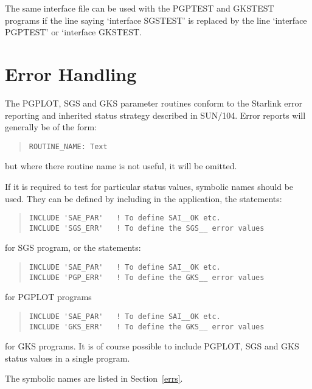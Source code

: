 \documentclass[twoside,11pt]{article}
\newcommand{\hyperref}[4]{#2\ref{#4}#3}
\newcommand{\xref}[3]{#1}
\renewcommand{\_}{\texttt{\symbol{95}}}
\begin{document}
The same interface file can be used with the PGPTEST and GKSTEST programs if
the line saying `interface SGSTEST' is replaced by the line `interface
PGPTEST' or `interface GKSTEST.

\section{Error Handling}
\label{errhnd}
The PGPLOT, SGS and GKS parameter routines conform to the Starlink error
reporting and inherited status strategy described in \xref{SUN/104}{sun104}{}.
Error reports will generally be of the form:
\begin{quote}
\begin{verbatim}
ROUTINE_NAME: Text
\end{verbatim}
\end{quote}
but where there routine name is not useful, it will be omitted.

If it is required to test for particular status values, symbolic names should
be used. They can be defined by including in the application, the statements:

\begin{quote}
\begin{verbatim}
INCLUDE 'SAE_PAR'   ! To define SAI__OK etc.
INCLUDE 'SGS_ERR'   ! To define the SGS__ error values
\end{verbatim}
\end{quote}

for SGS program, or the statements:

\begin{quote}
\begin{verbatim}
INCLUDE 'SAE_PAR'   ! To define SAI__OK etc.
INCLUDE 'PGP_ERR'   ! To define the GKS__ error values
\end{verbatim}
\end{quote}

for PGPLOT programs\begin{quote}

\begin{verbatim}
INCLUDE 'SAE_PAR'   ! To define SAI__OK etc.
INCLUDE 'GKS_ERR'   ! To define the GKS__ error values
\end{verbatim}
\end{quote}

for GKS programs. It is of course possible to include PGPLOT, SGS and GKS
status values in a single program.

The symbolic names are listed in \hyperref{here}{Section~}{}{errs}.
\end{document}
